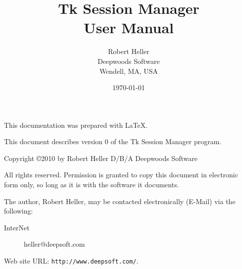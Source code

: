 \documentclass[12pt,notitlepage,twoside]{book}
\begin{document}
\title{Tk Session Manager \\ User Manual}
\author{Robert Heller \\ Deepwoods Software \\ Wendell, MA, USA}
\date{\today}
\begin{titlepage}

\maketitle

\clearpage


This documentation was prepared with \LaTeX.

This document describes version 0 of the Tk Session Manager program.

{\small Copyright \copyright 2010 by Robert Heller D/B/A Deepwoods Software}

\vspace{.25in}

All rights reserved.  Permission is granted to copy this document in
electronic form only, so long as it is with the software it
documents. 

The author, Robert Heller, may be contacted electronically (E-Mail) via
the following:

\begin{description}
\item[InterNet] heller@deepsoft.com
\end{description}

Web site URL: {\tt http://www.deepsoft.com/}.

\thispagestyle{empty}
\setcounter{page}{0}
\clearpage

\end{titlepage}


\tableofcontents
\listoffigures
\listoftables
\cleardoublepage
%       
%       

%
\cleardoublepage
{}
%





{\footnotesize
 
}
\cleardoublepage
\printindex
\end{document}
